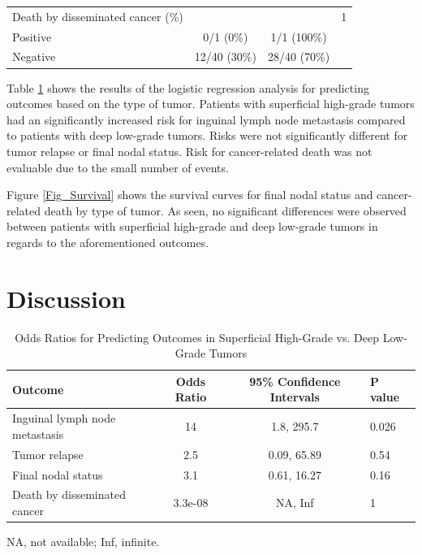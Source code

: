 \documentclass[11pt,letterpaper]{article}\usepackage[]{graphicx}\usepackage[]{color}
\begin{document}
\begin{multicols}{2}
\begin{table}
\begin{tabular}{lccl}
\hspace{2ex} Death by disseminated cancer (\%) & ~ & ~ & 1 \\
\hspace{4ex} Positive
        & 0/1 (0\%)
        & 1/1 (100\%)
        & ~ \\
\hspace{4ex} Negative
        & 12/40 (30\%)
        & 28/40 (70\%)
        & ~ \\
\hline
\end{tabular}
\end{table}



Table \ref{Table_OR} shows the results of the logistic regression analysis for predicting outcomes based on the type of tumor. Patients with superficial high-grade tumors had an significantly increased risk for inguinal lymph node metastasis compared to patients with deep low-grade tumors. Risks were not significantly different for tumor relapse or final nodal status. Risk for cancer-related death was not evaluable due to the small number of events.

Figure \ref{Fig_Survival} shows the survival curves for final nodal status and cancer-related death by type of tumor. As seen, no significant differences were observed between patients with superficial high-grade and deep low-grade tumors in regards to the aforementioned outcomes.

\section*{Discussion}

\begin{table}
\centering
\caption{Odds Ratios for Predicting Outcomes in Superficial High-Grade vs. Deep Low-Grade Tumors}
\label{Table_OR}
\begin{tabular}{lccl}
\hline
\textbf{Outcome} & \textbf{Odds Ratio} & \textbf{95\% Confidence Intervals} & \textbf{P value} \\
\hline
Inguinal lymph node metastasis
        & 14
        &   1.8, 295.7
        & 0.026 \\
Tumor relapse
        & 2.5
        &  0.09, 65.89
        & 0.54 \\
Final nodal status
        & 3.1
        &  0.61, 16.27
        & 0.16 \\
Death by disseminated cancer
        & 3.3e-08
        &  NA, Inf
        & 1 \\
\hline
\end{tabular}
\begin{tablenotes}
\small
\item NA, not available; Inf, infinite.
\end{tablenotes}
\end{table}


\end{multicols}
\end{document}
